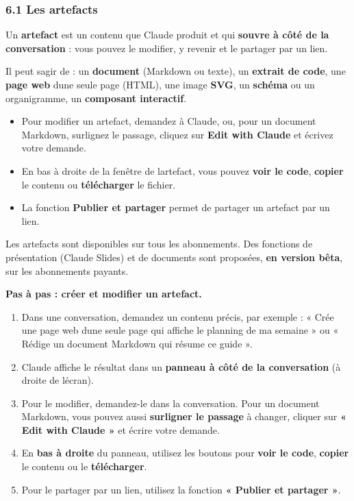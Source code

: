 \documentclass[
  french,
  11pt,
  a4paper,
]{article}
\providecommand{\tightlist}{%
  \setlength{\itemsep}{0pt}\setlength{\parskip}{0pt}}
\begin{document}
\subsubsection{6.1 Les artefacts}\label{61-les-artefacts}

Un \textbf{artefact} est un contenu que Claude produit et qui
\textbf{s\textquotesingle ouvre à côté de la conversation} : vous pouvez
le modifier, y revenir et le partager par un lien.

Il peut s\textquotesingle agir de : un \textbf{document} (Markdown ou
texte), un \textbf{extrait de code}, une \textbf{page web}
d\textquotesingle une seule page (HTML), une image \textbf{SVG}, un
\textbf{schéma} ou un organigramme, un \textbf{composant interactif}.

\begin{itemize}
\tightlist
\item
  Pour modifier un artefact, demandez à Claude, ou, pour un document
  Markdown, surlignez le passage, cliquez sur \textbf{Edit with Claude}
  et écrivez votre demande.
\item
  En bas à droite de la fenêtre de l\textquotesingle artefact, vous
  pouvez \textbf{voir le code}, \textbf{copier} le contenu ou
  \textbf{télécharger} le fichier.
\item
  La fonction \textbf{Publier et partager} permet de partager un
  artefact par un lien.
\end{itemize}

Les artefacts sont disponibles sur tous les abonnements. Des fonctions
de présentation (Claude Slides) et de documents sont proposées,
\textbf{en version bêta}, sur les abonnements payants.

\textbf{Pas à pas : créer et modifier un artefact.}

\begin{enumerate}
\def\labelenumi{\arabic{enumi}.}
\tightlist
\item
  Dans une conversation, demandez un contenu précis, par exemple : «
  Crée une page web d\textquotesingle une seule page qui affiche le
  planning de ma semaine » ou « Rédige un document Markdown qui résume
  ce guide ».
\item
  Claude affiche le résultat dans un \textbf{panneau à côté de la
  conversation} (à droite de l\textquotesingle écran).
\item
  Pour le modifier, demandez-le dans la conversation. Pour un document
  Markdown, vous pouvez aussi \textbf{surligner le passage} à changer,
  cliquer sur \textbf{« Edit with Claude »} et écrire votre demande.
\item
  En \textbf{bas à droite} du panneau, utilisez les boutons pour
  \textbf{voir le code}, \textbf{copier} le contenu ou le
  \textbf{télécharger}.
\item
  Pour le partager par un lien, utilisez la fonction \textbf{« Publier
  et partager »}.
\end{enumerate}
\end{document}
